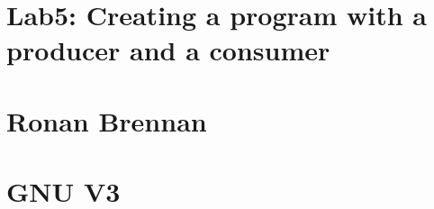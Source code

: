 \section*{Lab5\+: Creating a program with a producer and a consumer}

\section*{Ronan Brennan}

\section*{G\+NU V3}